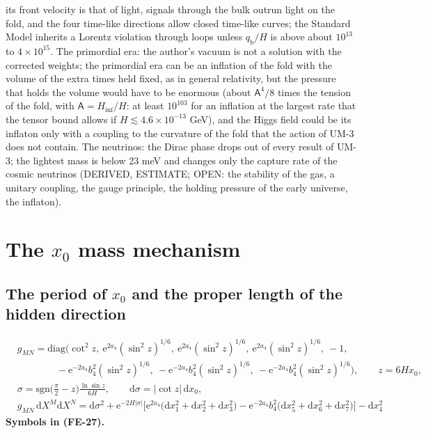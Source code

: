 \documentclass[
  10pt,
]{article}
\begin{document}
\begin{enumerate}
  its front velocity is that of light, signals through the bulk outrun
  light on the fold, and the four time-like directions allow closed
  time-like curves; the Standard Model inherits a Lorentz violation
  through loops unless \(q_{\mathrm{b}}/H\) is above about \(10^{13}\)
  to \(4\times10^{15}\). The primordial era: the author's vacuum is not
  a solution with the corrected weights; the primordial era can be an
  inflation of the fold with the volume of the extra times held fixed,
  as in general relativity, but the pressure that holds the volume would
  have to be enormous (about \(\mathsf{A}^4/8\) times the tension of the
  fold, with \(\mathsf{A} = H_{\mathrm{inf}}/H\): at least \(10^{103}\)
  for an inflation at the largest rate that the tensor bound allows if
  \(H \lesssim 4.6\times10^{-13}\) GeV), and the Higgs field could be
  its inflaton only with a coupling to the curvature of the fold that
  the action of UM-3 does not contain. The neutrinos: the Dirac phase
  drops out of every result of UM-3; the lightest mass is below 23 meV
  and changes only the capture rate of the cosmic neutrinos (DERIVED,
  ESTIMATE; OPEN: the stability of the gas, a unitary coupling, the
  gauge principle, the holding pressure of the early universe, the
  inflaton).
\end{enumerate}

\hypertarget{the-x_0-mass-mechanism}{%
\section{\texorpdfstring{The \(x_0\) mass
mechanism}{The x\_0 mass mechanism}}\label{the-x_0-mass-mechanism}}

\hypertarget{the-period-of-x_0-and-the-proper-length-of-the-hidden-direction}{%
\subsection{\texorpdfstring{The period of \(x_0\) and the proper length
of the hidden
direction}{The period of x\_0 and the proper length of the hidden direction}}\label{the-period-of-x_0-and-the-proper-length-of-the-hidden-direction}}

\[
\begin{aligned}
&g_{MN} = \mathrm{diag}\Big(\cot^2z,\ \mathrm{e}^{2a_4}(\sin^2z)^{1/6},\ \mathrm{e}^{2a_4}(\sin^2z)^{1/6},
 \ \mathrm{e}^{2a_4}(\sin^2z)^{1/6},\ -1,\\
&\qquad\qquad -\mathrm{e}^{-2a_4}b_4^2(\sin^2z)^{1/6},\ -\mathrm{e}^{-2a_4}b_4^2(\sin^2z)^{1/6},
 \ -\mathrm{e}^{-2a_4}b_4^2(\sin^2z)^{1/6}\Big),\qquad z = 6Hx_0,\\
&\sigma = \mathrm{sgn}\Big(\frac{\pi}{2} - z\Big)\frac{\ln\sin z}{6H},\qquad \mathrm{d}\sigma = \lvert\cot z\rvert\,\mathrm{d}x_0,\\
&g_{MN}\,\mathrm{d}X^M\mathrm{d}X^N = \mathrm{d}\sigma^2 + \mathrm{e}^{-2H\lvert\sigma\rvert}\Big[\mathrm{e}^{2a_4}\big(\mathrm{d}x_1^2
 + \mathrm{d}x_2^2 + \mathrm{d}x_3^2\big) - \mathrm{e}^{-2a_4}b_4^2\big(\mathrm{d}x_5^2 + \mathrm{d}x_6^2 + \mathrm{d}x_7^2\big)\Big]
 - \mathrm{d}x_4^2
\end{aligned} \tag{FE-27}
\] \textbf{Symbols in (FE-27).}
\end{document}
